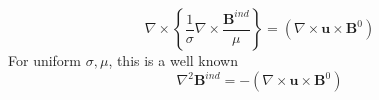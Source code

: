 \documentclass[11pt]{article}
\newcommand{\B}{\mathbf{B}}
\newcommand{\U}{\mathbf{u}}
\begin{document}
\begin{equation}
  \nabla \times
  \left\{
  \frac{1}{\sigma}
  \nabla \times
  \frac{\B^{ind}}{\mu}
  \right\}
  =
  (\nabla \times \U \times \B^0)
\end{equation}
For uniform $\sigma, \mu$, this is a well known
\begin{equation}
  \nabla^2 \B^{ind}
  =
  -
  (\nabla \times \U \times \B^0)
\end{equation}
\end{document}
